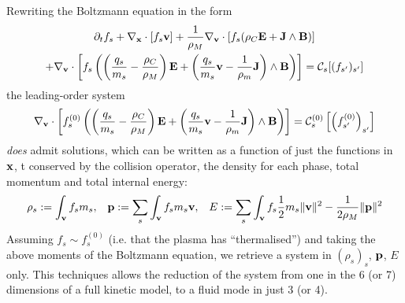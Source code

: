     Rewriting the Boltzmann equation in the form
    {\small \begin{multline}
        \partial_{t}f_{s} + \nabla_{\mathbf{x}}\cdot[f_{s}\mathbf{v}] + \frac{1}{\rho_{M}}\nabla_{\mathbf{v}}\cdot\left[f_{s}(\rho_{C}\mathbf{E} + \mathbf{J}\wedge\mathbf{B})\right]  \\
        + \nabla_{\mathbf{v}}\cdot\left[f_{s}\left(\left(\frac{q_{s}}{m_{s}} - \frac{\rho_{C}}{\rho_{M}}\right)\mathbf{E} + \left(\frac{q_{s}}{m_{s}}\mathbf{v} - \frac{1}{\rho_{m}}\mathbf{J}\right)\wedge\mathbf{B}\right)\right]  =  \mathcal{C}_{s}[(f_{s'})_{s'}]
    \end{multline}}
    the leading-order system
    \begin{equation}
        \nabla_{\mathbf{v}}\cdot\left[f_{s}^{(0)}\left(\left(\frac{q_{s}}{m_{s}} - \frac{\rho_{C}}{\rho_{M}}\right)\mathbf{E} + \left(\frac{q_{s}}{m_{s}}\mathbf{v} - \frac{1}{\rho_{m}}\mathbf{J}\right)\wedge\mathbf{B}\right)\right]  =  \mathcal{C}_{s}^{(0)}\left[\left(f_{s'}^{(0)}\right)_{s'}\right]
    \end{equation}
    \emph{does} admit solutions, which can be written as a function of just the functions in $\mathbf{x}$, t conserved by the collision operator, the density for each phase, total momentum and total internal energy:
    \begin{align}
        \rho_{s}  :=  \int_{\mathbf{v}}f_{s}m_{s},  &&
        \mathbf{p}  :=  \sum_{s}\int_{\mathbf{v}}f_{s}m_{s}\mathbf{v},  &&
        E  :=  \sum_{s}\int_{\mathbf{v}}f_{s}\frac{1}{2}m_{s}\|\mathbf{v}\|^{2} - \frac{1}{2\rho_{M}}\|\mathbf{p}\|^{2}
    \end{align}
    Assuming $f_{s}  \sim  f_{s}^{(0)}$ (i.e. that the plasma has ``thermalised'') and taking the above moments of the Boltzmann equation, we retrieve a system in $(\rho_{s})_{s}$, $\mathbf{p}$, $E$ only. This techniques allows the reduction of the system from one in the 6 (or 7) dimensions of a full kinetic model, to a fluid mode in just 3 (or 4).
    
